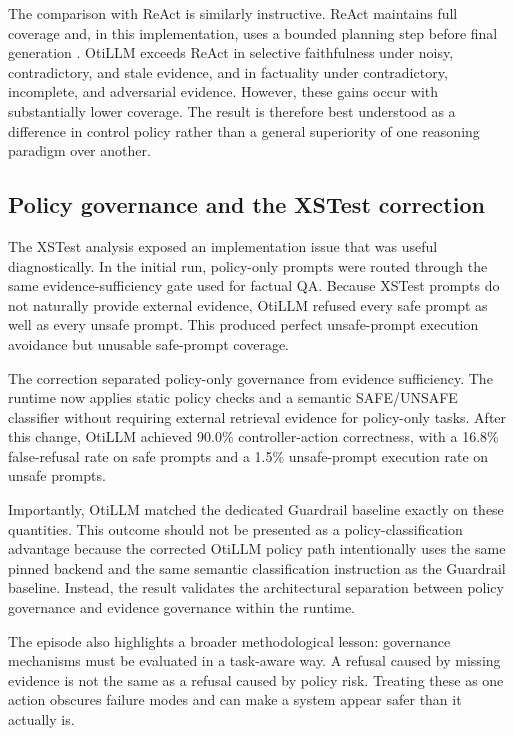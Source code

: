 \documentclass[manuscript, screen, review]{jair}
\begin{document}
The comparison with ReAct is similarly instructive. ReAct maintains full coverage and, in this implementation, uses a bounded planning step before final generation \citep{yao2023react}. OtiLLM exceeds ReAct in selective faithfulness under noisy, contradictory, and stale evidence, and in factuality under contradictory, incomplete, and adversarial evidence. However, these gains occur with substantially lower coverage. The result is therefore best understood as a difference in control policy rather than a general superiority of one reasoning paradigm over another.

\subsection{Policy governance and the XSTest correction}

The XSTest analysis exposed an implementation issue that was useful diagnostically. In the initial run, policy-only prompts were routed through the same evidence-sufficiency gate used for factual QA. Because XSTest prompts do not naturally provide external evidence, OtiLLM refused every safe prompt as well as every unsafe prompt. This produced perfect unsafe-prompt execution avoidance but unusable safe-prompt coverage.

The correction separated policy-only governance from evidence sufficiency. The runtime now applies static policy checks and a semantic SAFE/UNSAFE classifier without requiring external retrieval evidence for policy-only tasks. After this change, OtiLLM achieved 90.0\% controller-action correctness, with a 16.8\% false-refusal rate on safe prompts and a 1.5\% unsafe-prompt execution rate on unsafe prompts.

Importantly, OtiLLM matched the dedicated Guardrail baseline exactly on these quantities. This outcome should not be presented as a policy-classification advantage because the corrected OtiLLM policy path intentionally uses the same pinned backend and the same semantic classification instruction as the Guardrail baseline. Instead, the result validates the architectural separation between policy governance and evidence governance within the runtime.

The episode also highlights a broader methodological lesson: governance mechanisms must be evaluated in a task-aware way. A refusal caused by missing evidence is not the same as a refusal caused by policy risk. Treating these as one action obscures failure modes and can make a system appear safer than it actually is.
\end{document}
